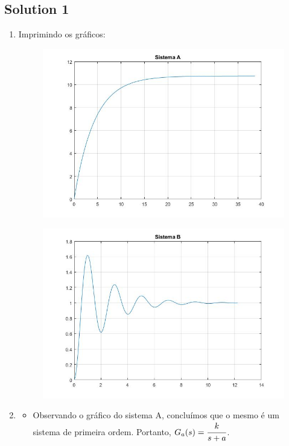 \documentclass[a4paper,11pt]{article}
\begin{document}
\subsection*{Solution 1}
\begin{enumerate}
	\item Imprimindo os gráficos:\\
	\begin{figure}[!h]  \includegraphics [scale=0.5] {Figures/systemA} \end{figure}
	\begin{figure}[!h]  \includegraphics [scale=0.5] {Figures/systemB} \end{figure}
	\item \begin{itemize}
		\item Observando o gráfico do sistema A, concluímos que o mesmo é um sistema de primeira ordem. Portanto, $G_a(s) = \cfrac{k}{s+a} $.

\end{itemize}
\end{enumerate}
\end{document}

